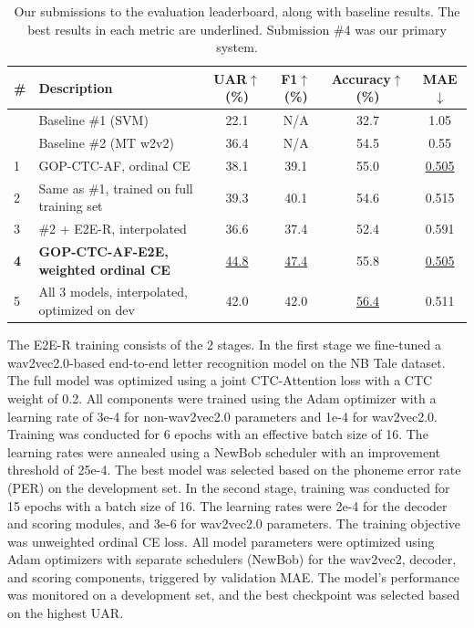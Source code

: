 \documentclass{article}
\begin{document}
\begin{table}[]
\centering
\label{tab:eval-results}
\caption{Our submissions to the evaluation leaderboard, along with baseline results. The best results in each metric are underlined. Submission \#4 was our primary system.}
\begin{tabular}{llcccc}
\toprule
\# & Description                               & UAR$\uparrow$  (\%)  & F1$\uparrow$ (\%) & Accuracy$\uparrow$ (\%) & MAE$\downarrow$   \\ 
\midrule
& Baseline \#1 (SVM) \cite{getman2025non} & 22.1 &  N/A & 32.7 & 1.05 \\
& Baseline \#2 (MT w2v2) \cite{getman2025non} & 36.4 & N/A & 54.5 & 0.55 \\ \midrule
1  & GOP-CTC-AF, ordinal CE                       & 38.1      & 39.1    & 55.0          & \underline{0.505} \\
2  & Same as \#1, trained on full training set & 39.3      & 40.1    & 54.6          & 0.515 \\
3  & \#2 + E2E-R, interpolated                 & 36.6      & 37.4    & 52.4          & 0.591 \\
\textbf{4} & \textbf{GOP-CTC-AF-E2E, weighted ordinal CE}              & \underline{44.8}      & \underline{47.4}    & 55.8          & \underline{0.505} \\ 
5  & All 3 models, interpolated, optimized on dev                & 42.0      & 42.0    & \underline{56.4}          & 0.511 \\ \bottomrule
\end{tabular}
\end{table}



The E2E-R training consists of the 2 stages. In the first stage we fine-tuned a wav2vec2.0-based end-to-end letter recognition model on the NB Tale dataset. The full model was optimized using a joint CTC-Attention loss with a CTC weight of 0.2. All components were trained using the Adam optimizer with a learning rate of 3e-4 for non-wav2vec2.0 parameters and 1e-4 for wav2vec2.0. Training was conducted for 6 epochs with  an effective batch size of 16. The learning rates were annealed using a NewBob scheduler with an improvement threshold of 25e-4. The best model was selected based on the phoneme error rate (PER) on the development set. In the second stage, training was conducted for 15 epochs with a batch size of 16. The learning rates were 2e-4 for the decoder and scoring modules, and  3e-6 for wav2vec2.0 parameters.  The training objective was unweighted ordinal CE loss. All model parameters were optimized using Adam optimizers with separate schedulers (NewBob) for the wav2vec2, decoder, and scoring components, triggered by validation MAE. The model’s performance was monitored on a development set, and the best checkpoint was selected based on the highest UAR.
\end{document}

